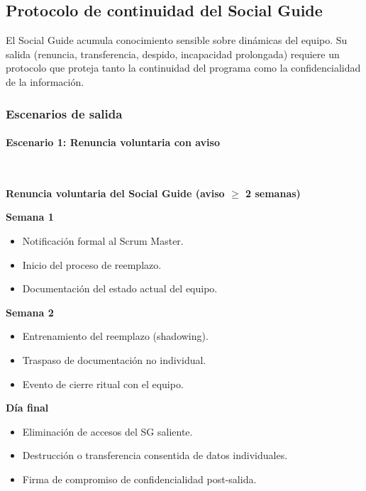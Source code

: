 \subsection{Protocolo de continuidad del Social Guide}

El Social Guide acumula conocimiento sensible sobre dinámicas del equipo. Su salida (renuncia, transferencia, despido, incapacidad prolongada) requiere un protocolo que proteja tanto la continuidad del programa como la confidencialidad de la información.

\subsubsection{Escenarios de salida}

\paragraph{Escenario 1: Renuncia voluntaria con aviso}\mbox{}\\[-0.3\baselineskip]

\begin{escenario}
    \textbf{Renuncia voluntaria del Social Guide (aviso $\geq$ 2 semanas)}

    \textbf{Semana 1}
    \begin{itemize}
        \item Notificación formal al Scrum Master.
        \item Inicio del proceso de reemplazo.
        \item Documentación del estado actual del equipo.
    \end{itemize}

    \textbf{Semana 2}
    \begin{itemize}
        \item Entrenamiento del reemplazo (shadowing).
        \item Traspaso de documentación no individual.
        \item Evento de cierre ritual con el equipo.
    \end{itemize}

    \textbf{Día final}
    \begin{itemize}
        \item Eliminación de accesos del SG saliente.
        \item Destrucción o transferencia consentida de datos individuales.
        \item Firma de compromiso de confidencialidad post-salida.
    \end{itemize}
\end{escenario}


